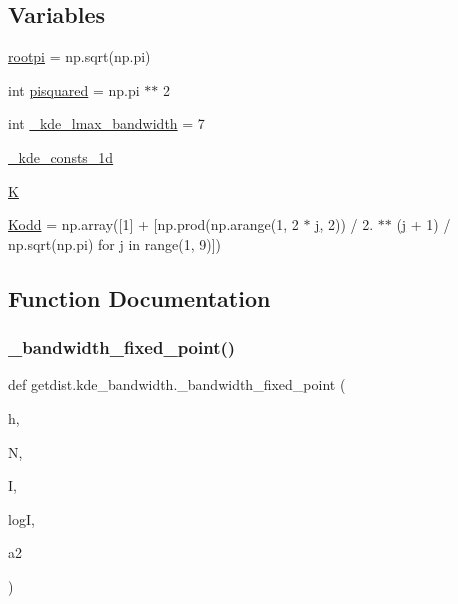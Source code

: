 \subsection*{Variables}
\begin{DoxyCompactItemize}
\item 
\mbox{\hyperlink{namespacegetdist_1_1kde__bandwidth_a3b896a6f8b1cc4091f9453b1dee57d57}{rootpi}} = np.\+sqrt(np.\+pi)
\item 
int \mbox{\hyperlink{namespacegetdist_1_1kde__bandwidth_a67e26ab8f1117e6d105d5669cb0794e5}{pisquared}} = np.\+pi $\ast$$\ast$ 2
\item 
int \mbox{\hyperlink{namespacegetdist_1_1kde__bandwidth_a18140b2db4e2dd0c18a5fcb429f4ea81}{\+\_\+kde\+\_\+lmax\+\_\+bandwidth}} = 7
\item 
\mbox{\hyperlink{namespacegetdist_1_1kde__bandwidth_a6ccd1e18c748bab78b5e71f61be3957d}{\+\_\+kde\+\_\+consts\+\_\+1d}}
\item 
\mbox{\hyperlink{namespacegetdist_1_1kde__bandwidth_ae479f48a64078bb494beb949c517f991}{K}}
\item 
\mbox{\hyperlink{namespacegetdist_1_1kde__bandwidth_ab44d512c76fd1b5bf5c913e7e28c4471}{Kodd}} = np.\+array(\mbox{[}1\mbox{]} + \mbox{[}np.\+prod(np.\+arange(1, 2 $\ast$ \mbox{\hyperlink{plotcls_8m_ac86694252f8dfdb19aaeadc4b7c342c6}{j}}, 2)) / 2. $\ast$$\ast$ (\mbox{\hyperlink{plotcls_8m_ac86694252f8dfdb19aaeadc4b7c342c6}{j}} + 1) / np.\+sqrt(np.\+pi) for \mbox{\hyperlink{plotcls_8m_ac86694252f8dfdb19aaeadc4b7c342c6}{j}} in range(1, 9)\mbox{]})
\end{DoxyCompactItemize}


\subsection{Function Documentation}
\mbox{\label{namespacegetdist_1_1kde__bandwidth_a17c5a5d4b6eef8e7aad98a74bc775377}} 
\subsubsection{\texorpdfstring{\+\_\+bandwidth\+\_\+fixed\+\_\+point()}{\_bandwidth\_fixed\_point()}}
{\footnotesize\ttfamily def getdist.\+kde\+\_\+bandwidth.\+\_\+bandwidth\+\_\+fixed\+\_\+point (\begin{DoxyParamCaption}\item[{}]{h,  }\item[{}]{N,  }\item[{}]{I,  }\item[{}]{logI,  }\item[{}]{a2 }\end{DoxyParamCaption})\hspace{0.3cm}{\ttfamily [private]}}



